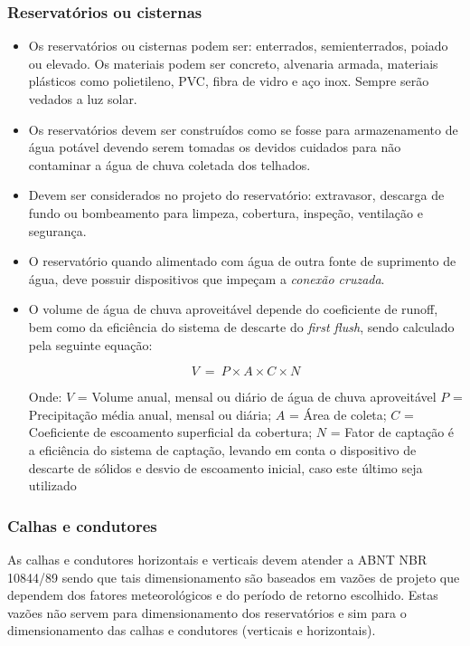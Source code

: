 \subsubsection{Reservatórios ou cisternas}
\begin{itemize}
\item Os reservatórios ou cisternas podem ser: enterrados, semienterrados, poiado ou elevado. Os materiais podem ser concreto, alvenaria armada, materiais plásticos como polietileno, PVC, fibra de vidro e aço inox. Sempre serão vedados a luz solar.

\item Os reservatórios devem ser construídos como se fosse para armazenamento de água potável devendo serem tomadas os devidos cuidados para não contaminar a água de chuva coletada dos telhados.

\item Devem ser considerados no projeto do reservatório: extravasor, descarga de fundo ou bombeamento para limpeza, cobertura, inspeção, ventilação e segurança.

\item O reservatório quando alimentado com água de outra fonte de suprimento de água, deve possuir dispositivos que impeçam a \textit{conexão cruzada}.

\item O volume de água de chuva aproveitável depende do coeficiente de runoff, bem como da eficiência do sistema de descarte do \textit{first flush}, sendo calculado pela seguinte equação:

$$V\ =\ P\times A\times C\times N$$

Onde:
$V$ = Volume anual, mensal ou diário de água de chuva aproveitável
$P$ = Precipitação média anual, mensal ou diária;
$A$ = Área de coleta;
$C$ = Coeficiente de escoamento superficial da cobertura;
$N$ = Fator de captação é a eficiência do sistema de captação, levando em conta o dispositivo de descarte de sólidos e desvio de escoamento inicial, caso este último seja utilizado

\end{itemize}

\subsubsection{Calhas e condutores}

	As calhas e condutores horizontais e verticais devem atender a ABNT NBR 10844/89 sendo que tais dimensionamento são baseados em vazões de projeto que dependem dos fatores meteorológicos e do período de retorno escolhido. Estas vazões não servem para dimensionamento dos reservatórios e sim para o dimensionamento das calhas e condutores (verticais e horizontais). 

